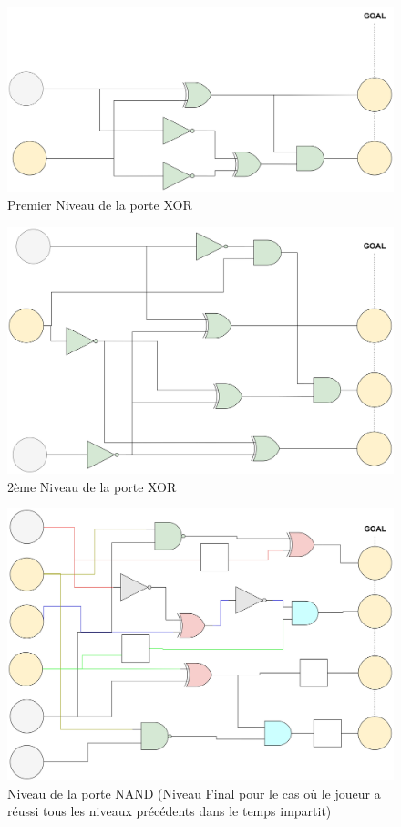 \documentclass{article}
\begin{document}
\begin{figure}[h]
    \centering
    \includegraphics[width=\textwidth]{img/Levels-XOR-1.jpg}
    \caption{Premier Niveau de la porte XOR}
\end{figure}
\begin{figure}[h]
    \centering
    \includegraphics[width=\textwidth]{img/Levels-XOR-2.jpg}
    \caption{2ème Niveau de la porte XOR}
\end{figure}

\begin{figure}[h]
    \centering
    \includegraphics[width=\textwidth]{img/Levels-NAND-2.jpg}
    \caption{Niveau de la porte NAND (Niveau Final pour le cas où le joueur a réussi tous les niveaux précédents dans le temps impartit)}
\end{figure}
\end{document}
